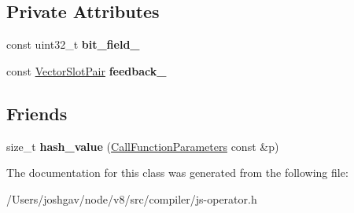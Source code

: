 \subsection*{Private Attributes}
\begin{DoxyCompactItemize}
\item 
const uint32\+\_\+t {\bfseries bit\+\_\+field\+\_\+}\hypertarget{classv8_1_1internal_1_1compiler_1_1_call_function_parameters_ab37b9c3c6613ca468568d3b04a96348e}{}\label{classv8_1_1internal_1_1compiler_1_1_call_function_parameters_ab37b9c3c6613ca468568d3b04a96348e}

\item 
const \hyperlink{classv8_1_1internal_1_1compiler_1_1_vector_slot_pair}{Vector\+Slot\+Pair} {\bfseries feedback\+\_\+}\hypertarget{classv8_1_1internal_1_1compiler_1_1_call_function_parameters_a03244dcc0a4798360701ab00ec96de8e}{}\label{classv8_1_1internal_1_1compiler_1_1_call_function_parameters_a03244dcc0a4798360701ab00ec96de8e}

\end{DoxyCompactItemize}
\subsection*{Friends}
\begin{DoxyCompactItemize}
\item 
size\+\_\+t {\bfseries hash\+\_\+value} (\hyperlink{classv8_1_1internal_1_1compiler_1_1_call_function_parameters}{Call\+Function\+Parameters} const \&p)\hypertarget{classv8_1_1internal_1_1compiler_1_1_call_function_parameters_a6bee52532e17c4167b2d6e950d8f47bf}{}\label{classv8_1_1internal_1_1compiler_1_1_call_function_parameters_a6bee52532e17c4167b2d6e950d8f47bf}

\end{DoxyCompactItemize}


The documentation for this class was generated from the following file\+:\begin{DoxyCompactItemize}
\item 
/\+Users/joshgav/node/v8/src/compiler/js-\/operator.\+h\end{DoxyCompactItemize}
